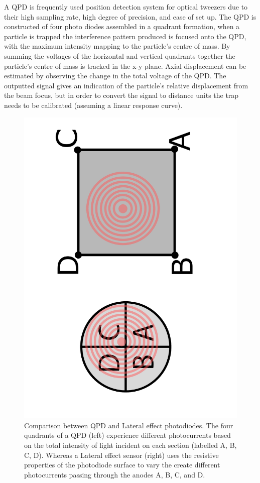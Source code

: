 A QPD is frequently used position detection system for optical 
tweezers due to their high sampling rate, high degree of 
precision, and ease of set up. The QPD is constructed of four photo 
diodes assembled in a quadrant formation, when a particle is trapped the 
interference pattern produced is focused onto the QPD, with 
the maximum intensity mapping to the particle's centre of mass. 
By summing the voltages of the horizontal and vertical quadrants 
together the particle's centre of mass is tracked in the x-y 
plane. Axial displacement can be estimated by observing the change
in the total voltage of the QPD. The outputted signal gives an
indication of the particle's relative displacement from the beam 
focus, but in order to convert the signal to distance units the
trap needs to be calibrated (assuming a linear response curve).
\begin{figure}[h!]
	\centering
	\includegraphics[height=\linewidth, angle=270]{QPD_Lateral_effect.pdf}
	\caption{Comparison between QPD and Lateral effect photodiodes.
	The four quadrants of a QPD (left) experience different photocurrents
	based on the total intensity of light incident on each section 
	(labelled A, B, C, D). 
	Whereas a Lateral effect sensor (right) uses the resistive properties
	of the photodiode surface to vary the create different photocurrents 
	passing through the anodes A, B, C, and D.}
\end{figure}

